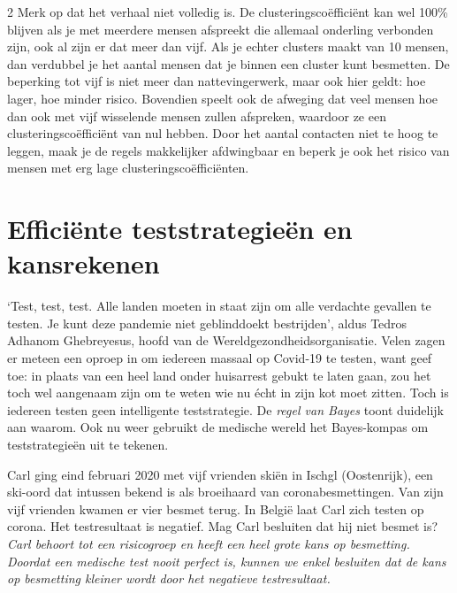 \begin{multicols}{2}
Merk op dat het verhaal niet volledig is. De clusteringscoëfficiënt kan wel 100\% blijven als je met meerdere mensen afspreekt die allemaal onderling verbonden zijn, ook al zijn er dat meer dan vijf. Als je echter clusters maakt van 10 mensen, dan verdubbel je het aantal mensen dat je binnen een cluster kunt besmetten. De beperking tot vijf is niet meer dan nattevingerwerk, maar ook hier geldt: hoe lager, hoe minder risico. Bovendien speelt ook de afweging dat veel mensen hoe dan ook met vijf wisselende mensen zullen afspreken, waardoor ze een clusteringscoëfficiënt van nul hebben. Door het aantal contacten niet te hoog te leggen, maak je de regels makkelijker afdwingbaar en beperk je ook het risico van mensen met erg lage clusteringscoëfficiënten.


\section{Efficiënte teststrategieën en kansrekenen}
`Test, test, test. Alle landen moeten in staat zijn om alle verdachte gevallen te testen. Je kunt deze pandemie niet geblinddoekt bestrijden', aldus Tedros Adhanom Ghebreyesus, hoofd van de Wereldgezondheidsorganisatie. Velen zagen er meteen een oproep in om iedereen massaal op Covid-19 te testen, want geef toe: in plaats van een heel land onder huisarrest gebukt te laten gaan, zou het toch wel aangenaam zijn om te weten wie nu écht in zijn kot moet zitten. Toch is iedereen testen geen intelligente teststrategie. De \textit{regel van Bayes} toont duidelijk aan waarom. Ook nu weer gebruikt de medische wereld het Bayes-kompas om teststrategieën uit te tekenen. 
\end{multicols}


\noindent Carl ging eind februari 2020 met vijf vrienden  skiën in Ischgl (Oostenrijk), een ski-oord dat intussen bekend is als broeihaard van coronabesmettingen. Van zijn vijf vrienden kwamen er vier besmet terug. In België laat Carl zich testen op corona. Het testresultaat is negatief. Mag Carl besluiten dat hij niet besmet is?\\

\noindent 
\emph{Carl behoort tot een  risicogroep en heeft een heel grote kans op besmetting. Doordat een medische test nooit perfect is, kunnen we enkel besluiten dat de kans op besmetting kleiner wordt door het negatieve testresultaat.}

